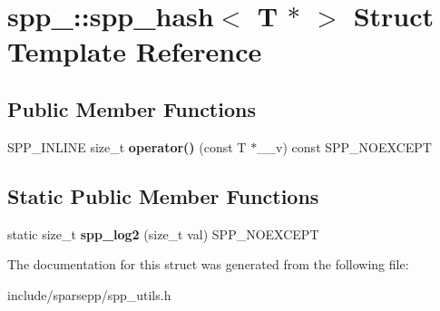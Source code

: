 \hypertarget{structspp___1_1spp__hash_3_01_t_01_5_01_4}{}\section{spp\+\_\+\+:\+:spp\+\_\+hash$<$ T $\ast$ $>$ Struct Template Reference}
\label{structspp___1_1spp__hash_3_01_t_01_5_01_4}
\subsection*{Public Member Functions}
\begin{DoxyCompactItemize}
\item 
S\+P\+P\+\_\+\+I\+N\+L\+I\+NE size\+\_\+t {\bfseries operator()} (const T $\ast$\+\_\+\+\_\+v) const S\+P\+P\+\_\+\+N\+O\+E\+X\+C\+E\+PT\hypertarget{structspp___1_1spp__hash_3_01_t_01_5_01_4_a2e3e397b23e10f0fef4f1312033491b4}{}\label{structspp___1_1spp__hash_3_01_t_01_5_01_4_a2e3e397b23e10f0fef4f1312033491b4}

\end{DoxyCompactItemize}
\subsection*{Static Public Member Functions}
\begin{DoxyCompactItemize}
\item 
static size\+\_\+t {\bfseries spp\+\_\+log2} (size\+\_\+t val) S\+P\+P\+\_\+\+N\+O\+E\+X\+C\+E\+PT\hypertarget{structspp___1_1spp__hash_3_01_t_01_5_01_4_aab3965685a49b738f8c3397ee360b8dd}{}\label{structspp___1_1spp__hash_3_01_t_01_5_01_4_aab3965685a49b738f8c3397ee360b8dd}

\end{DoxyCompactItemize}


The documentation for this struct was generated from the following file\+:\begin{DoxyCompactItemize}
\item 
include/sparsepp/spp\+\_\+utils.\+h\end{DoxyCompactItemize}
